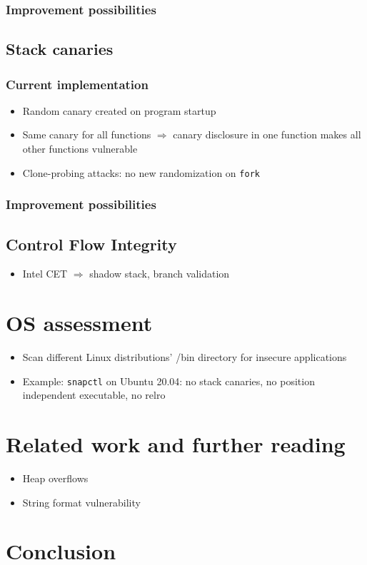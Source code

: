 \subsection{Improvement possibilities}
\label{subsec:aslr-improvement}

\section{Stack canaries}
\label{sec:stack-canaries}

\subsection{Current implementation}
\label{subsec:canaries-current}

\begin{itemize}
	\item{Random canary created on program startup}
	\item{Same canary for all functions $\Rightarrow$ canary disclosure in one function makes all other functions vulnerable}
	\item{Clone-probing attacks: no new randomization on \texttt{fork}}
\end{itemize}

\subsection{Improvement possibilities}
\label{subsec:canaries-improvement}

\section{Control Flow Integrity}
\label{sec:cfi}

\begin{itemize}
	\item{Intel CET $\Rightarrow$ shadow stack, branch validation}
\end{itemize}

\chapter{OS assessment}
\label{chp:os-assessment}

\begin{itemize}
	\item{Scan different Linux distributions' /bin directory for insecure applications}
	\item{Example: \texttt{snapctl} on Ubuntu 20.04: no stack canaries, no position independent executable, no \gls{relro}}
\end{itemize}
%

\chapter{Related work and further reading}
\label{chp:related-work}

\begin{itemize}
	\item{Heap overflows}
	\item{String format vulnerability}
\end{itemize}

\chapter{Conclusion}
\label{chp:conclusion}